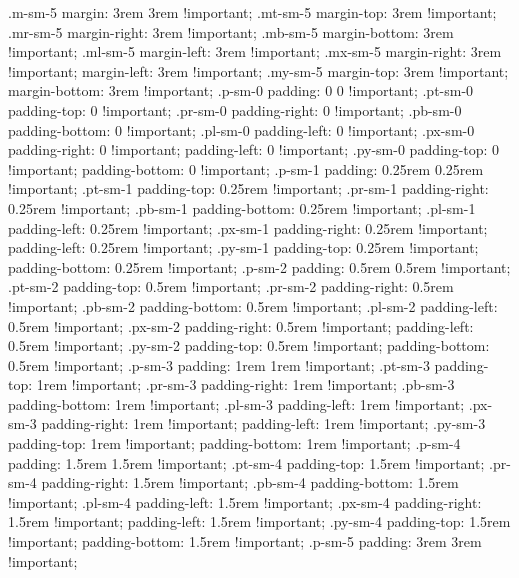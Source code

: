 {{{{{{{{{{{{{{{{{{{{{{{{{{{{{{{{{{{{{{{{{{{{{{{{{{{{{{{{{{{{{{{{{{{{{{{{{{{{{{{{{{{{{{{{{{{{{{{{{{{{{{{{{{{{{{{{{{{{{{{{{{{{{{{{{{{{{{{{{{{{{{{{{{{{{{{{{{{{{{{{{{{{{{{{{{{{{{{{{{{{{{{{{{{{{{{{{{{{{{{{{{{{{{{{{{{{{{{{{{{{{{{{{{{{{{{{{{{{{{{{{{{{{{{{{{{{{{{{{{{{{{{{{{{{{{{{{{{{{{{{{{{{{{{{{{{{{{{{{{{{{{{{{{{  .m-sm-5 {
    margin: 3rem 3rem !important; }
  .mt-sm-5 {
    margin-top: 3rem !important; }
  .mr-sm-5 {
    margin-right: 3rem !important; }
  .mb-sm-5 {
    margin-bottom: 3rem !important; }
  .ml-sm-5 {
    margin-left: 3rem !important; }
  .mx-sm-5 {
    margin-right: 3rem !important;
    margin-left: 3rem !important; }
  .my-sm-5 {
    margin-top: 3rem !important;
    margin-bottom: 3rem !important; }
  .p-sm-0 {
    padding: 0 0 !important; }
  .pt-sm-0 {
    padding-top: 0 !important; }
  .pr-sm-0 {
    padding-right: 0 !important; }
  .pb-sm-0 {
    padding-bottom: 0 !important; }
  .pl-sm-0 {
    padding-left: 0 !important; }
  .px-sm-0 {
    padding-right: 0 !important;
    padding-left: 0 !important; }
  .py-sm-0 {
    padding-top: 0 !important;
    padding-bottom: 0 !important; }
  .p-sm-1 {
    padding: 0.25rem 0.25rem !important; }
  .pt-sm-1 {
    padding-top: 0.25rem !important; }
  .pr-sm-1 {
    padding-right: 0.25rem !important; }
  .pb-sm-1 {
    padding-bottom: 0.25rem !important; }
  .pl-sm-1 {
    padding-left: 0.25rem !important; }
  .px-sm-1 {
    padding-right: 0.25rem !important;
    padding-left: 0.25rem !important; }
  .py-sm-1 {
    padding-top: 0.25rem !important;
    padding-bottom: 0.25rem !important; }
  .p-sm-2 {
    padding: 0.5rem 0.5rem !important; }
  .pt-sm-2 {
    padding-top: 0.5rem !important; }
  .pr-sm-2 {
    padding-right: 0.5rem !important; }
  .pb-sm-2 {
    padding-bottom: 0.5rem !important; }
  .pl-sm-2 {
    padding-left: 0.5rem !important; }
  .px-sm-2 {
    padding-right: 0.5rem !important;
    padding-left: 0.5rem !important; }
  .py-sm-2 {
    padding-top: 0.5rem !important;
    padding-bottom: 0.5rem !important; }
  .p-sm-3 {
    padding: 1rem 1rem !important; }
  .pt-sm-3 {
    padding-top: 1rem !important; }
  .pr-sm-3 {
    padding-right: 1rem !important; }
  .pb-sm-3 {
    padding-bottom: 1rem !important; }
  .pl-sm-3 {
    padding-left: 1rem !important; }
  .px-sm-3 {
    padding-right: 1rem !important;
    padding-left: 1rem !important; }
  .py-sm-3 {
    padding-top: 1rem !important;
    padding-bottom: 1rem !important; }
  .p-sm-4 {
    padding: 1.5rem 1.5rem !important; }
  .pt-sm-4 {
    padding-top: 1.5rem !important; }
  .pr-sm-4 {
    padding-right: 1.5rem !important; }
  .pb-sm-4 {
    padding-bottom: 1.5rem !important; }
  .pl-sm-4 {
    padding-left: 1.5rem !important; }
  .px-sm-4 {
    padding-right: 1.5rem !important;
    padding-left: 1.5rem !important; }
  .py-sm-4 {
    padding-top: 1.5rem !important;
    padding-bottom: 1.5rem !important; }
  .p-sm-5 {
    padding: 3rem 3rem !important; }
}}}}}}}}}}}}}}}}}}}}}}}}}}}}}}}}}}}}}}}}}}}}}}}}}}}}}}}}}}}}}}}}}}}}}}}}}}}}}}}}}}}}}}}}}}}}}}}}}}}}}}}}}}}}}}}}}}}}}}}}}}}}}}}}}}}}}}}}}}}}}}}}}}}}}}}}}}}}}}}}}}}}}}}}}}}}}}}}}}}}}}}}}}}}}}}}}}}}}}}}}}}}}}}}}}}}}}}}}}}}}}}}}}}}}}}}}}}}}}}}}}}}}}}}}}}}}}}}}}}}}}}}}}}}}}}}}}}}}}}}}}}}}}}}}}}}}}}}}}}}}}}}}}}
